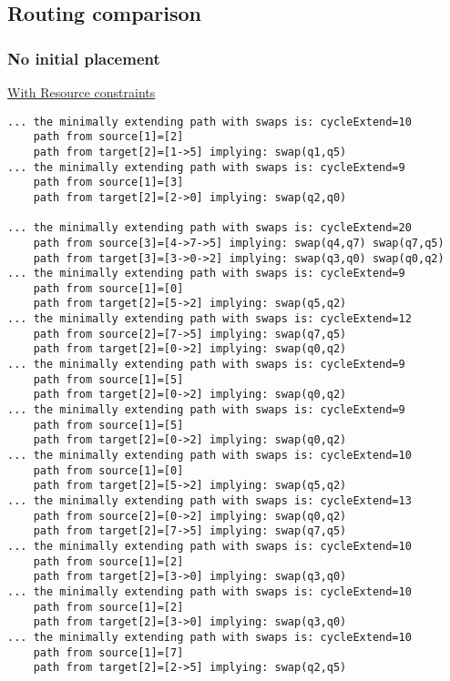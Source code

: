 \documentclass[11pt]{article}
\begin{document}
\subsection{Routing comparison}
\label{sec:org1889cbd}

\subsubsection{No initial placement}
\label{sec:org29a9912}

\begin{minipage}[t]{.45\textwidth}

\uline{With Resource constraints}

\begin{verbatim}
... the minimally extending path with swaps is: cycleExtend=10
	path from source[1]=[2]
	path from target[2]=[1->5] implying: swap(q1,q5)
... the minimally extending path with swaps is: cycleExtend=9
	path from source[1]=[3]
	path from target[2]=[2->0] implying: swap(q2,q0)
	
... the minimally extending path with swaps is: cycleExtend=20
	path from source[3]=[4->7->5] implying: swap(q4,q7) swap(q7,q5)
	path from target[3]=[3->0->2] implying: swap(q3,q0) swap(q0,q2)
... the minimally extending path with swaps is: cycleExtend=9
	path from source[1]=[0]
	path from target[2]=[5->2] implying: swap(q5,q2)
... the minimally extending path with swaps is: cycleExtend=12
	path from source[2]=[7->5] implying: swap(q7,q5)
	path from target[2]=[0->2] implying: swap(q0,q2)
... the minimally extending path with swaps is: cycleExtend=9
	path from source[1]=[5]
	path from target[2]=[0->2] implying: swap(q0,q2)
... the minimally extending path with swaps is: cycleExtend=9
	path from source[1]=[5]
	path from target[2]=[0->2] implying: swap(q0,q2)
... the minimally extending path with swaps is: cycleExtend=10
	path from source[1]=[0]
	path from target[2]=[5->2] implying: swap(q5,q2)
... the minimally extending path with swaps is: cycleExtend=13
	path from source[2]=[0->2] implying: swap(q0,q2)
	path from target[2]=[7->5] implying: swap(q7,q5)
... the minimally extending path with swaps is: cycleExtend=10
	path from source[1]=[2]
	path from target[2]=[3->0] implying: swap(q3,q0)
... the minimally extending path with swaps is: cycleExtend=10
	path from source[1]=[2]
	path from target[2]=[3->0] implying: swap(q3,q0)
... the minimally extending path with swaps is: cycleExtend=10
	path from source[1]=[7]
	path from target[2]=[2->5] implying: swap(q2,q5)
\end{verbatim}

\end{minipage}
\end{document}
